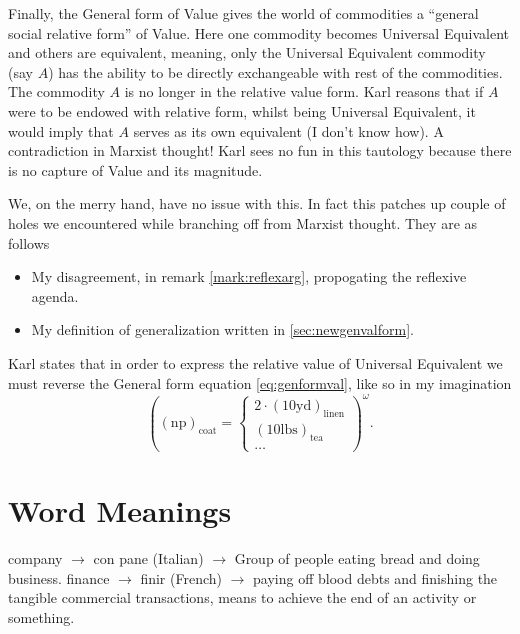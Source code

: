 \documentclass[12pt]{extarticle}
\theoremstyle{definition}
\begin{document}
Finally, the General form of Value gives the world of commodities a ``general social relative form'' of Value.  Here one commodity becomes Universal Equivalent and others are equivalent, meaning, only the Universal Equivalent commodity (say $A$) has the ability to be directly exchangeable with rest of the commodities.  The commodity $A$ is no longer in the relative value form.  Karl reasons that if $A$ were to be endowed with relative form, whilst being Universal Equivalent, it would imply that $A$ serves as its own equivalent (I don't know how).  A contradiction in Marxist thought!  Karl sees no fun in this tautology because there is no capture of Value and its magnitude.

We, on the merry hand, have no issue with this.  In fact this patches up couple of holes we encountered while branching off from Marxist thought.  They are as follows
\begin{itemize}
\item My disagreement, in remark \ref{mark:reflexarg}, propogating the reflexive agenda.
\item My definition of generalization written in \ref{sec:newgenvalform}.
\end{itemize}

Karl states that in order to express the relative value of Universal Equivalent we must reverse the General form equation \ref{eq:genformval}, like so in my imagination
\begin{equation}
  \left(
  (\text{np})_{\text{coat}} = \begin{cases*} 
    2\cdot (10\text{yd})_{\text{linen}}\\
     (10\text{lbs})_{\text{tea}}\\
      \ldots
   \end{cases*}\right)^\omega.
\end{equation}





\appendix

\section{Word Meanings}
company $\rightarrow$ con pane (Italian) $\rightarrow$ Group of people eating bread and doing business.\newline
finance $\rightarrow$ finir (French) $\rightarrow$ paying off blood debts and finishing the tangible commercial transactions, means to achieve the end of an activity or something.
\end{document}
